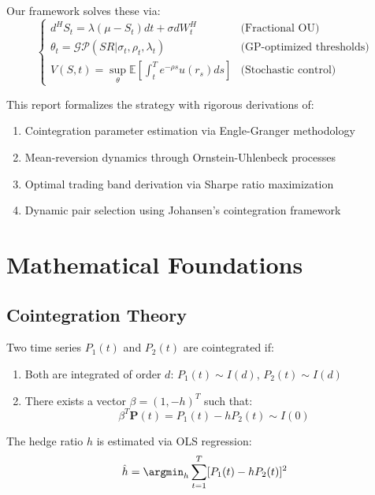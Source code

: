 \documentclass[12pt]{article}
\begin{document}
Our framework solves these via:
\begin{equation*}
\begin{cases}
d^H S_t = \lambda(\mu - S_t)dt + \sigma dW_t^H & \text{(Fractional OU)} \\
\theta_t = \mathcal{GP}(SR|\sigma_t, \rho_t, \lambda_t) & \text{(GP-optimized thresholds)} \\
V(S,t) = \sup_{\theta} \mathbb{E}[\int_t^T e^{-\rho s} u(r_s)ds] & \text{(Stochastic control)}
\end{cases}
\end{equation*}

This report formalizes the strategy with rigorous derivations of:
\begin{enumerate}
    \item Cointegration parameter estimation via Engle-Granger methodology
    \item Mean-reversion dynamics through Ornstein-Uhlenbeck processes
    \item Optimal trading band derivation via Sharpe ratio maximization
    \item Dynamic pair selection using Johansen's cointegration framework
\end{enumerate}

\section{Mathematical Foundations}

\subsection{Cointegration Theory}

Two time series $P_1(t)$ and $P_2(t)$ are cointegrated if:
\begin{enumerate}
    \item Both are integrated of order $d$: $P_1(t) \sim I(d)$, $P_2(t) \sim I(d)$
    \item There exists a vector $\beta = (1, -h)^T$ such that:
    \begin{equation}
    \beta^T \mathbf{P}(t) = P_1(t) - hP_2(t) \sim I(0)
    \end{equation}
\end{enumerate}

The hedge ratio $h$ is estimated via OLS regression:
\begin{equation}
\hat{h} = \argmin_h \sum_{t=1}^T [P_1(t) - hP_2(t)]^2
\end{equation}
\end{document}
